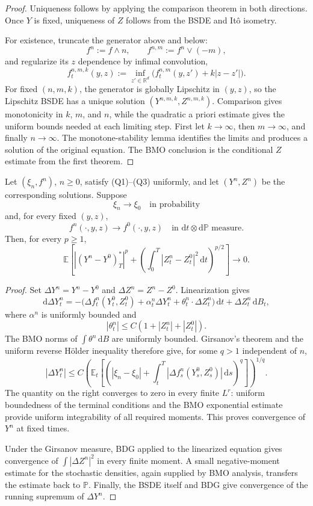 \begin{proof}
Uniqueness follows by applying the comparison theorem in both
directions.  Once $Y$ is fixed, uniqueness of $Z$ follows from the BSDE
and It\^o isometry.

For existence, truncate the generator above and below:
\[
  f^n:=f\wedge n,
  \qquad
  f^{n,m}:=f^n\vee(-m),
\]
and regularize its $z$ dependence by infimal convolution,
\[
  f_t^{n,m,k}(y,z)
  :=\inf_{z'\in\mathbb R^d}
    \bigl(f_t^{n,m}(y,z')+k|z-z'|\bigr).
\]
For fixed $(n,m,k)$, the generator is globally Lipschitz in $(y,z)$, so
the Lipschitz BSDE has a unique solution $(Y^{n,m,k},Z^{n,m,k})$.
Comparison gives monotonicity in $k$, $m$, and $n$, while the quadratic
a priori estimate gives the uniform bounds needed at each limiting
step.  First let $k\to\infty$, then $m\to\infty$, and finally
$n\to\infty$.  The monotone-stability lemma identifies the limits and
produces a solution of the original equation.  The BMO conclusion is
the conditional $Z$ estimate from the first theorem.
\end{proof}

\begin{thm}
Let $(\xi_n,f^n)$, $n\ge0$, satisfy \textup{(Q1)}--\textup{(Q3)}
uniformly, and let $(Y^n,Z^n)$ be the corresponding solutions.  Suppose
\[
  \xi_n\to\xi_0\quad\text{in probability}
\]
and, for every fixed $(y,z)$,
\[
  f^n(\cdot,y,z)\to f^0(\cdot,y,z)
  \quad\text{in }\mathrm dt\otimes\mathrm d\mathbb P\text{ measure}.
\]
Then, for every $p\ge1$,
\[
  \mathbb E\!\left[
    |(Y^n-Y^0)_T^*|^p
    +\left(\int_0^T|Z_t^n-Z_t^0|^2\,\mathrm dt\right)^{p/2}
  \right]\longrightarrow0.
\]
\end{thm}

\begin{proof}
Set $\Delta Y^n=Y^n-Y^0$ and $\Delta Z^n=Z^n-Z^0$.  Linearization gives
\[
  \mathrm d\Delta Y_t^n
  =-\bigl(
    \Delta f_t^n(Y_t^0,Z_t^0)
    +\alpha_t^n\Delta Y_t^n
    +\theta_t^n\cdot\Delta Z_t^n
  \bigr)\,\mathrm dt
  +\Delta Z_t^n\,\mathrm dB_t,
\]
where $\alpha^n$ is uniformly bounded and
\[
  |\theta_t^n|\le C(1+|Z_t^n|+|Z_t^0|).
\]
The BMO norms of $\int\theta^n\,\mathrm dB$ are uniformly bounded.
Girsanov's theorem and the uniform reverse H\"older inequality therefore
give, for some $q>1$ independent of $n$,
\[
  |\Delta Y_t^n|
  \le C\left(
    \mathbb E_t\!\left[
      \left(
        |\xi_n-\xi_0|
        +\int_t^T|\Delta f_s^n(Y_s^0,Z_s^0)|\,\mathrm ds
      \right)^q
    \right]
  \right)^{1/q}.
\]
The quantity on the right converges to zero in every finite $L^r$:
uniform boundedness of the terminal conditions and the BMO exponential
estimate provide uniform integrability of all required moments.  This
proves convergence of $Y^n$ at fixed times.

Under the Girsanov measure, BDG applied to the linearized equation gives
convergence of
$\int|\Delta Z^n|^2$ in every finite moment.  A small negative-moment
estimate for the stochastic densities, again supplied by BMO analysis,
transfers the estimate back to $\mathbb P$.  Finally, the BSDE itself and
BDG give convergence of the running supremum of $\Delta Y^n$.
\end{proof}
